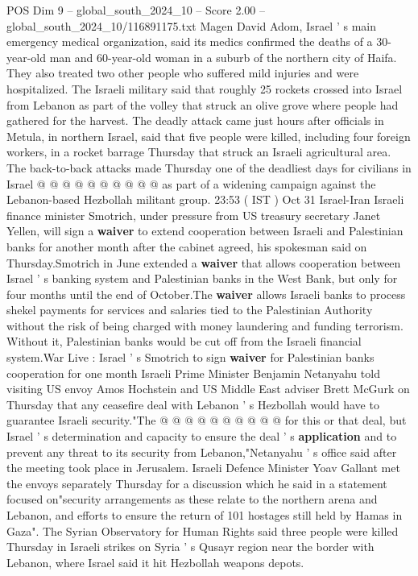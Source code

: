 \begin{textsample}{POS Dim 9 – global\_south\_2024\_10 – Score 2.00 – global\_south\_2024\_10/116891175.txt}
Magen David Adom, Israel ' s main emergency medical organization, said its medics confirmed the deaths of a 30-year-old man and 60-year-old woman in a suburb of the northern city of Haifa.
They also treated two other people who suffered mild injuries and were hospitalized.
The Israeli military said that roughly 25 rockets crossed into Israel from Lebanon as part of the volley that struck an olive grove where people had gathered for the harvest.
The deadly attack came just hours after officials in Metula, in northern Israel, said that five people were killed, including four foreign workers, in a rocket barrage Thursday that struck an Israeli agricultural area.
The back-to-back attacks made Thursday one of the deadliest days for civilians in Israel @ @ @ @ @ @ @ @ @ @ as part of a widening campaign against the Lebanon-based Hezbollah militant group. 23:53 ( IST ) Oct 31 Israel-Iran Israeli finance minister Smotrich, under pressure from US treasury secretary Janet Yellen, will sign a \textbf{waiver} to extend cooperation between Israeli and Palestinian banks for another month after the cabinet agreed, his spokesman said on Thursday.Smotrich in June extended a \textbf{waiver} that allows cooperation between Israel ' s banking system and Palestinian banks in the West Bank, but only for four months until the end of October.The \textbf{waiver} allows Israeli banks to process shekel payments for services and salaries tied to the Palestinian Authority without the risk of being charged with money laundering and funding terrorism.
Without it, Palestinian banks would be cut off from the Israeli financial system.War Live : Israel ' s Smotrich to sign \textbf{waiver} for Palestinian banks cooperation for one month Israeli Prime Minister Benjamin Netanyahu told visiting US envoy Amos Hochstein and US Middle East adviser Brett McGurk on Thursday that any ceasefire deal with Lebanon ' s Hezbollah would have to guarantee Israeli security."The @ @ @ @ @ @ @ @ @ @ for this or that deal, but Israel ' s determination and capacity to ensure the deal ' s \textbf{application} and to prevent any threat to its security from Lebanon,"Netanyahu ' s office said after the meeting took place in Jerusalem.
Israeli Defence Minister Yoav Gallant met the envoys separately Thursday for a discussion which he said in a statement focused on"security arrangements as these relate to the northern arena and Lebanon, and efforts to ensure the return of 101 hostages still held by Hamas in Gaza".
The Syrian Observatory for Human Rights said three people were killed Thursday in Israeli strikes on Syria ' s Qusayr region near the border with Lebanon, where Israel said it hit Hezbollah weapons depots.

\end{textsample}
